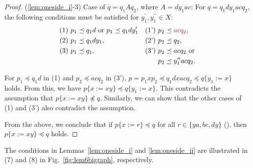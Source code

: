 \begin{proof}
\smallskip

\noindent
(\ref{lem:oneside_i}-3) Case of $q=q_{1}Aq_{2}$, where $A = dy_{1}ac$:
For $q=q_{1}dy_{1}acq_{2}$, the following conditions must be satisfied for $y_{1}^{\prime},y_{1}^{\prime\prime}\in X$:
\begin{align*}
  \textrm{(1)}~& p_{1} \preceq q_{1}d \mbox{~or~} p_{1} \preceq q_{1}dy_{1}^{\prime} & \textrm{(1')}~& p_{2} \preceq {\color{red} acq_{2}}, \\
  \textrm{(2)}~& p_{1} \preceq q_{1}dy_{1}, & \textrm{(2')}~& p_{2} \preceq q_{2}, \\
  \textrm{(3)}~& p_{1} \preceq q_{1}, & \textrm{(3')}~& p_{2} \preceq acq_{2} \mbox{~or}\\
  & & & p_{2} \preceq y_{1}^{\prime\prime}acq_{2}.
\end{align*}

For $p_{1} \preceq q_{1}d$ in (1) and $p_{2} \preceq acq_{2}$ in (3'), $p = p_{1}xp_{2} \preceq q_{1}dxacq_{2} \preceq q\{y_{1}:=x\}$ holds. From this, we have $p\{x:=xy\} \preceq q\{y_{1}:=x\}$. This contradicts the assumption that $p\{x:=xy\} \not\preceq q$. Similarly, we can show that the other cases of (1) and (3') also contradict the assumption.

From the above, we conclude that if $p \{ x := r \} \preceq q$ for all $r \in \{ ya, bc, dy \}$ (\TheConditionB), then $p \{ x := xy \} \preceq q$ holds.
\end{proof}

The conditions in Lemmas~\ref{lem:oneside_i} and \ref{lem:oneside_ii} are illustrated in (7) and (8) in Fig.~\ref{fig:lem6bigraph}, respectively.


